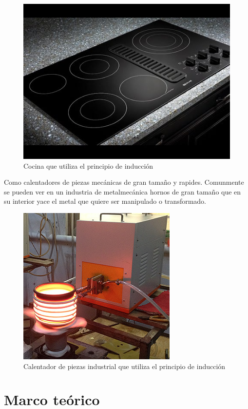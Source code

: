 \documentclass[12pt]{article}
\begin{document}
\begin{figure}[H]
\centering
\includegraphics[scale=0.65]{src/images/Cocina.jpg}
\caption{Cocina que utiliza el principio de inducción}
\label{fgr:Cocina}
\end{figure}

Como calentadores de piezas mecánicas de gran tamaño y rapides. Comunmente se pueden ver en un industria de metalmecánica hornos de gran tamaño que en su interior yace el metal que quiere ser manipulado o transformado.

\begin{figure}[H]
\centering
\includegraphics[scale=0.75]{src/images/Calentador_de_juntas.jpg}
\caption{Calentador de piezas industrial que utiliza el principio de inducción}
\label{fgr:Calentador_de_juntas}
\end{figure}

\section{Marco teórico}
\end{document}
